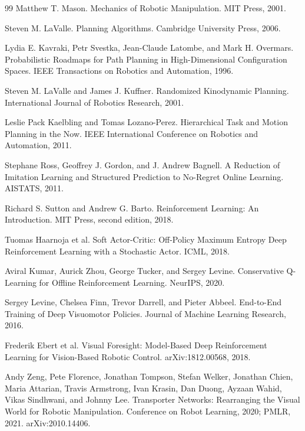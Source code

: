 \documentclass[11pt,oneside,openany]{oblivoir}
\numberwithin{section}{chapter}
\numberwithin{subsection}{section}
\numberwithin{equation}{chapter}
\begin{document}
\begin{thebibliography}{99}
Matthew T. Mason.
\newblock Mechanics of Robotic Manipulation.
\newblock MIT Press, 2001.

Steven M. LaValle.
\newblock Planning Algorithms.
\newblock Cambridge University Press, 2006.

Lydia E. Kavraki, Petr Svestka, Jean-Claude Latombe, and Mark H. Overmars.
\newblock Probabilistic Roadmaps for Path Planning in High-Dimensional Configuration Spaces.
\newblock IEEE Transactions on Robotics and Automation, 1996.

Steven M. LaValle and James J. Kuffner.
\newblock Randomized Kinodynamic Planning.
\newblock International Journal of Robotics Research, 2001.

Leslie Pack Kaelbling and Tomas Lozano-Perez.
\newblock Hierarchical Task and Motion Planning in the Now.
\newblock IEEE International Conference on Robotics and Automation, 2011.

Stephane Ross, Geoffrey J. Gordon, and J. Andrew Bagnell.
\newblock A Reduction of Imitation Learning and Structured Prediction to No-Regret Online Learning.
\newblock AISTATS, 2011.

Richard S. Sutton and Andrew G. Barto.
\newblock Reinforcement Learning: An Introduction.
\newblock MIT Press, second edition, 2018.

Tuomas Haarnoja et al.
\newblock Soft Actor-Critic: Off-Policy Maximum Entropy Deep Reinforcement Learning with a Stochastic Actor.
\newblock ICML, 2018.

Aviral Kumar, Aurick Zhou, George Tucker, and Sergey Levine.
\newblock Conservative Q-Learning for Offline Reinforcement Learning.
\newblock NeurIPS, 2020.

Sergey Levine, Chelsea Finn, Trevor Darrell, and Pieter Abbeel.
\newblock End-to-End Training of Deep Visuomotor Policies.
\newblock Journal of Machine Learning Research, 2016.

Frederik Ebert et al.
\newblock Visual Foresight: Model-Based Deep Reinforcement Learning for Vision-Based Robotic Control.
\newblock arXiv:1812.00568, 2018.

Andy Zeng, Pete Florence, Jonathan Tompson, Stefan Welker, Jonathan Chien,
Maria Attarian, Travis Armstrong, Ivan Krasin, Dan Duong, Ayzaan Wahid,
Vikas Sindhwani, and Johnny Lee.
\newblock Transporter Networks: Rearranging the Visual World for Robotic Manipulation.
\newblock Conference on Robot Learning, 2020; PMLR, 2021. arXiv:2010.14406.


\end{thebibliography}
\end{document}
